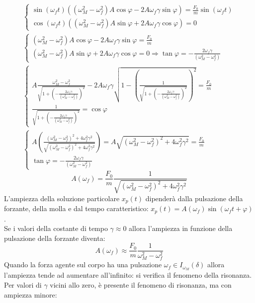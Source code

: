 \documentclass{article}
\numberwithin{equation}{subsection}
\begin{document}
\begin{gather*}
    \begin{cases}
        \sin(\omega_f t)((\omega_M^{2}-\omega_f^{2})A\cos\varphi-2A\omega_f\gamma \sin\varphi)=\displaystyle\frac{F_0}{m}\sin(\omega_f t)\\
        \cos(\omega_f t)((\omega_M^{2}-\omega_f^{2})A\sin\varphi+2A\omega_f\gamma \cos\varphi)=0
    \end{cases}\\
    \begin{cases}
        (\omega_M^{2}-\omega_f^{2})A\cos\varphi-2A\omega_f\gamma \sin\varphi=\displaystyle\frac{F_0}{m}\\
        (\omega_M^{2}-\omega_f^{2})A\sin\varphi+2A\omega_f\gamma \cos\varphi=0\Rightarrow\displaystyle \tan\varphi=-\frac{2\omega_f\gamma}{(\omega_M^{2}-\omega_f^{2})}
    \end{cases}\\
    \begin{cases}
        \displaystyle A\frac{\omega_M^{2}-\omega_f^{2}}{\sqrt{1+\left(-\frac{2\omega_f\gamma}{(\omega_M^{2}-\omega_f^{2})}\right)^{2}}}-2A\omega_f\gamma\sqrt{1-\left(\displaystyle\frac{1}{\sqrt{1+\left(-\frac{2\omega_f\gamma}{(\omega_M^{2}-\omega_f^{2})}\right)^{2}}}\right)^{2}}=\frac{F_0}{m}\\
        \displaystyle\frac{1}{\sqrt{1+\left(-\frac{2\omega_f\gamma}{(\omega_M^{2}-\omega_f^{2})}\right)^{2}}}=\cos\varphi
    \end{cases}\\
    \begin{cases}
        A\left(\displaystyle\frac{(\omega_M^{2}-\omega_f^{2})^{2}+4\omega_f^{2}\gamma^{2}}{\sqrt{(\omega_M^{2}-\omega_f^{2})^{2}+4\omega_f^{2}\gamma^{2}}}\right)=A\sqrt{(\omega_M^{2}-\omega_f^{2})^{2}+4\omega_f^{2}\gamma^{2}}=\displaystyle\frac{F_0}{m} \\
        \tan\varphi=-\displaystyle\frac{2\omega_f\gamma}{(\omega_M^{2}-\omega_f^{2})}
    \end{cases}
\end{gather*}
\begin{equation}
    A(\omega_f)=\frac{F_0}{m}\frac{1}{\sqrt{(\omega_M^{2}-\omega_f^{2})^{2}+4\omega_f^{2}\gamma^{2}}}
\end{equation}
L'ampiezza della soluzione particolare $x_p(t)$ dipenderà 
dalla pulsazione della forzante, della molla e dal tempo 
caratteristico: $x_p(t)=A(\omega_f)\sin(\omega_f t+\varphi)$. 
\\
Se i valori della costante di tempo $\gamma\approx0$ allora 
l'ampiezza in funzione della pulsazione della forzante diventa:
\begin{equation}
    A(\omega_f)\approx\displaystyle\frac{F_0}{m}\frac{1}{\omega_M^{2}-\omega_f^{2}}
\end{equation}
Quando la forza agente sul corpo ha una pulsazione 
$\omega_f\in I_{\omega_M}(\delta)$ allora l'ampiezza tende 
ad aumentare all'infinito: si verifica il fenomeno della 
risonanza. Per valori di $\gamma$ vicini allo zero, è presente 
il fenomeno di risonanza, ma con ampiezza minore:
\end{document}
